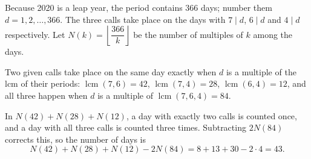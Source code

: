 Because 2020 is a leap year, the period contains $366$ days; number them $d=1,2,\dots,366$. The three calls take place on the days with $7\mid d$, $6\mid d$ and $4\mid d$ respectively. Let $N(k)=\left\lfloor\dfrac{366}{k}\right\rfloor$ be the number of multiples of $k$ among the days.

Two given calls take place on the same day exactly when $d$ is a multiple of the lcm of their periods: $\operatorname{lcm}(7,6)=42$, $\operatorname{lcm}(7,4)=28$, $\operatorname{lcm}(6,4)=12$, and all three happen when $d$ is a multiple of $\operatorname{lcm}(7,6,4)=84$.

In $N(42)+N(28)+N(12)$, a day with exactly two calls is counted once, and a day with all three calls is counted three times. Subtracting $2N(84)$ corrects this, so the number of days is
\[N(42)+N(28)+N(12)-2N(84)=8+13+30-2\cdot4=\boxed{43}.\]
